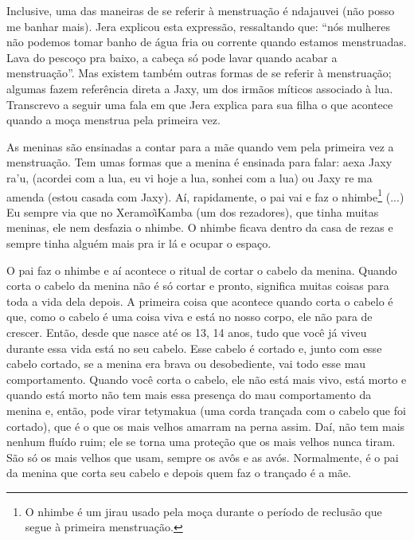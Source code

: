 \documentclass{article}
\begin{document}
Inclusive, uma das maneiras de se referir \`a menstrua\c{c}\~ao \'e
ndajauvei (n\~ao posso me banhar mais). Jera explicou esta express\~ao,
ressaltando que: {\textquotedblleft}n\'os mulheres n\~ao podemos tomar
banho de \'agua fria ou corrente quando estamos menstruadas. Lava do
pesco\c{c}o pra baixo, a cabe\c{c}a s\'o pode lavar quando acabar a
menstrua\c{c}\~ao{\textquotedblright}. Mas existem tamb\'em outras
formas de se referir \`a menstrua\c{c}\~ao; algumas fazem refer\^encia
direta a Jaxy, um dos irm\~aos m\'iticos associado \`a lua. Transcrevo
a seguir uma fala em que Jera explica para sua filha o que acontece
quando a mo\c{c}a menstrua pela primeira vez. 

As meninas s\~ao ensinadas a contar para a m\~ae quando vem pela
primeira vez a menstrua\c{c}\~ao. Tem umas formas que a menina \'e
ensinada para falar: aexa Jaxy ra{\textquoteright}u, (acordei com a
lua, eu vi hoje a lua, sonhei com a lua) ou Jaxy re ma amenda (estou
casada com Jaxy). A\'i, rapidamente, o pai vai e faz o nhimbe\footnote{
O nhimbe \'e um jirau usado pela mo\c{c}a durante o per\'iodo de
reclus\~ao que segue \`a primeira menstrua\c{c}\~ao. } (...) Eu sempre
via que no Xeramo\~\i Kamba (um dos rezadores), que tinha muitas
meninas, ele nem desfazia o nhimbe. O nhimbe ficava dentro da casa de
rezas e sempre tinha algu\'em mais pra ir l\'a e ocupar o espa\c{c}o. 

O pai faz o nhimbe e a\'i acontece o ritual de cortar o cabelo da
menina. Quando corta o cabelo da menina n\~ao \'e s\'o cortar e pronto,
significa muitas coisas para toda a vida dela depois. A primeira coisa
que acontece quando corta o cabelo \'e que, como o cabelo \'e uma coisa
viva e est\'a no nosso corpo, ele n\~ao para de crescer. Ent\~ao, desde
que nasce at\'e os 13, 14 anos, tudo que voc\^e j\'a viveu durante essa
vida est\'a no seu cabelo. Esse cabelo \'e cortado e, junto com esse
cabelo cortado, se a menina era brava ou desobediente, vai todo esse
mau comportamento. Quando voc\^e corta o cabelo, ele n\~ao est\'a mais
vivo, est\'a morto e quando est\'a morto n\~ao tem mais essa
presen\c{c}a do mau comportamento da menina e, ent\~ao, pode virar
tetymakua (uma corda tran\c{c}ada com o cabelo que foi cortado), que
\'e o que os mais velhos amarram na perna assim. Da\'i, n\~ao tem mais
nenhum flu\'ido ruim; ele se torna uma prote\c{c}\~ao que os mais
velhos nunca tiram. S\~ao s\'o os mais velhos que usam, sempre os
av\^os e as av\'os. Normalmente, \'e o pai da menina que corta seu
cabelo e depois quem faz o tran\c{c}ado \'e a m\~ae. 
\end{document}
